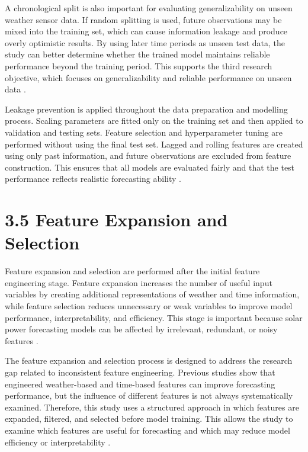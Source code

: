 A chronological split is also important for evaluating generalizability on unseen weather sensor data. If random splitting is used, future observations may be mixed into the training set, which can cause information leakage and produce overly optimistic results. By using later time periods as unseen test data, the study can better determine whether the trained model maintains reliable performance beyond the training period. This supports the third research objective, which focuses on generalizability and reliable performance on unseen data \parencite{JnanaVarshitha2025, ArellanosTafur2025, Ma2025}.

Leakage prevention is applied throughout the data preparation and modelling process. Scaling parameters are fitted only on the training set and then applied to validation and testing sets. Feature selection and hyperparameter tuning are performed without using the final test set. Lagged and rolling features are created using only past information, and future observations are excluded from feature construction. This ensures that all models are evaluated fairly and that the test performance reflects realistic forecasting ability \parencite{Duvuru2026, CarvalhoJunior2025, Alhassan2025}.

\section{3.5 Feature Expansion and Selection}

Feature expansion and selection are performed after the initial feature engineering stage. Feature expansion increases the number of useful input variables by creating additional representations of weather and time information, while feature selection reduces unnecessary or weak variables to improve model performance, interpretability, and efficiency. This stage is important because solar power forecasting models can be affected by irrelevant, redundant, or noisy features \parencite{JnanaVarshitha2025, TsaiLo2025, Pongphaw2025}.

The feature expansion and selection process is designed to address the research gap related to inconsistent feature engineering. Previous studies show that engineered weather-based and time-based features can improve forecasting performance, but the influence of different features is not always systematically examined. Therefore, this study uses a structured approach in which features are expanded, filtered, and selected before model training. This allows the study to examine which features are useful for forecasting and which may reduce model efficiency or interpretability \parencite{CarvalhoJunior2025, Eren2025, Duvuru2026}.

